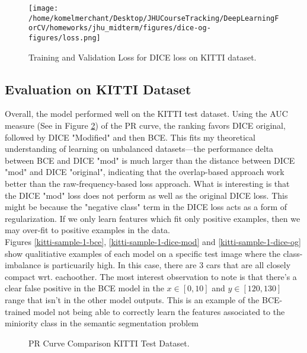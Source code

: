 \documentclass[Location Location Location! : Exploring Image Segmentation Problem In Urban Driving Scenarios]{IEEEtran}
\begin{document}
\begin{figure}[htbp]
\centerline{\texttt{[image: /home/komelmerchant/Desktop/JHUCourseTracking/DeepLearningForCV/homeworks/jhu\_midterm/figures/dice-og-figures/loss.png]}}
\caption{Training and Validation Loss for DICE loss on KITTI dataset.}
\label{dice-og-loss}
\end{figure}




\subsection{Evaluation on KITTI Dataset}
 
 

Overall, the model performed well on the KITTI test dataset. Using the AUC measure (See in Figure \ref{pr-curve}) of the PR curve, the ranking favors DICE original, followed by DICE "Modified" and then BCE. This fits my theoretical understanding of learning on unbalanced datasets—the performance delta between BCE and DICE "mod" is much larger than the distance between DICE "mod" and DICE "original", indicating that the overlap-based approach work better than the raw-frequency-based loss approach. What is interesting is that the DICE "mod" loss does not perform as well as the original DICE loss. This might be because the "negative class" term in the DICE loss acts as a form of regularization. If we only learn features which fit only positive examples, then we may over-fit to positive examples in the data.  
\\

Figures \ref{kitti-sample-1-bce}, \ref{kitti-sample-1-dice-mod} and \ref{kitti-sample-1-dice-og} show qualitiative examples of each model on a specific test image where the class-imbalance is particuarily high. In this case, there are 3 cars that are all closely compact wrt. eachoother. The most interest observation to note is that there's a clear false positive in the BCE model in the $x \in [0, 10]$ and $y \in [120, 130]$ range that isn't in the other model outputs. This is an example of the BCE-trained model not being able to correctly learn the features associated to the miniority class in the semantic segmentation problem


\begin{figure}[htbp]
\caption{PR Curve Comparison KITTI Test Dataset.}
\label{pr-curve}
\end{figure}
\end{document}
